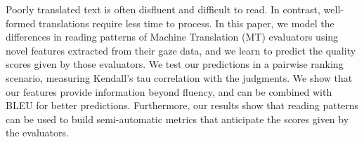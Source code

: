 Poorly translated text is often disfluent and difficult to read. In contrast, well-formed translations require less time to process. In this paper, we model the differences in reading patterns of Machine Translation (MT) evaluators using novel features extracted from their gaze data, and we learn to predict the quality scores given by those evaluators. We test our predictions in a pairwise ranking scenario, measuring Kendall's tau correlation with the judgments. We show that our features provide information beyond fluency, and can be combined with BLEU for better predictions. Furthermore, our results show that reading patterns can be used to build semi-automatic metrics that anticipate the scores given by the evaluators.
